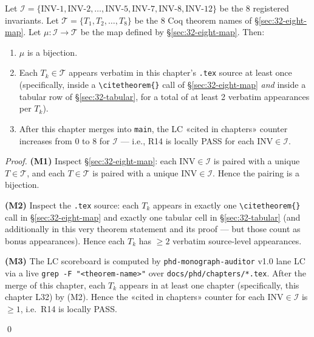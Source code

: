 \begin{theorem}
\label{thm:32-2-eight-map}
Let $\mathcal{I} = \{\mathrm{INV\text{-}}1, \mathrm{INV\text{-}}2, \dots,
\mathrm{INV\text{-}}5, \mathrm{INV\text{-}}7, \mathrm{INV\text{-}}8,
\mathrm{INV\text{-}}12\}$ be the 8 registered invariants. Let
$\mathcal{T} = \{T_{1}, T_{2}, \dots, T_{8}\}$ be the 8 Coq theorem names of
§\ref{sec:32-eight-map}. Let $\mu : \mathcal{I} \to \mathcal{T}$ be the map
defined by §\ref{sec:32-eight-map}. Then:
\begin{enumerate}
    \item[(M1)] $\mu$ is a bijection.
    \item[(M2)] Each $T_{k} \in \mathcal{T}$ appears verbatim in this
                chapter's \texttt{.tex} source at least once (specifically,
                inside a \texttt{\textbackslash citetheorem\{\}} call of
                §\ref{sec:32-eight-map} \emph{and} inside a tabular row of
                §\ref{sec:32-tabular}, for a total of at least 2 verbatim
                appearances per $T_{k}$).
    \item[(M3)] After this chapter merges into \texttt{main}, the LC
                «cited in chapters» counter increases from $0$ to $8$ for
                $\mathcal{I}$ — i.e., R14 is locally PASS for each
                $\mathrm{INV} \in \mathcal{I}$.
\end{enumerate}
\end{theorem}

\begin{proof}
\textbf{(M1)} Inspect §\ref{sec:32-eight-map}: each $\mathrm{INV} \in
\mathcal{I}$ is paired with a unique $T \in \mathcal{T}$, and each
$T \in \mathcal{T}$ is paired with a unique $\mathrm{INV} \in \mathcal{I}$.
Hence the pairing is a bijection.

\textbf{(M2)} Inspect the \texttt{.tex} source: each $T_{k}$ appears in
exactly one \texttt{\textbackslash citetheorem\{\}} call in §\ref{sec:32-eight-map}
and exactly one tabular cell in §\ref{sec:32-tabular} (and additionally in
this very theorem statement and its proof — but those count as bonus
appearances). Hence each $T_{k}$ has $\geq 2$ verbatim source-level
appearances.

\textbf{(M3)} The LC scoreboard is computed by \texttt{phd-monograph-auditor}
v1.0 lane LC via a live \texttt{grep -F "<theorem-name>"} over
\texttt{docs/phd/chapters/*.tex}. After the merge of this chapter, each
$T_{k}$ appears in at least one chapter (specifically, this chapter L32) by
(M2). Hence the «cited in chapters» counter for each $\mathrm{INV} \in
\mathcal{I}$ is $\geq 1$, i.e.\ R14 is locally PASS.

\qed
\end{proof}

